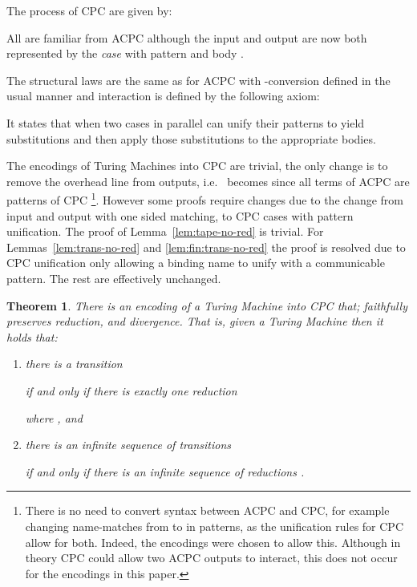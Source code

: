 \documentclass[submission,copyright,creativecommons]{eptcs}
\newtheorem{theorem}{Theorem}[section]
\begin{document}
The process of CPC are given by:

All are familiar from ACPC although the input and output are now both represented by
the {\em case}  with pattern  and body .

The structural laws are the same as for ACPC with -conversion defined in the usual
manner \cite{GivenWilsonGorlaJay10,givenwilson:hal-00987578} and interaction is defined by the following
axiom:

It states that when two cases in parallel can unify their patterns to yield substitutions
 and  then apply those substitutions to the appropriate bodies.


The encodings of Turing Machines into CPC are trivial, the only change is to remove
the overhead line from outputs, i.e.~ becomes  since all terms of
ACPC are patterns of CPC
\footnote{There is no need to convert syntax between ACPC and CPC, for example changing
name-matches from  to  in patterns, as the unification rules for CPC allow for both.
Indeed, the encodings were chosen to allow this.
Although in theory
CPC could allow two ACPC outputs to interact, this does not occur for the encodings in this paper.}.
However some proofs require changes due to the change from input and
output with one sided matching, to CPC cases with pattern unification.
The proof of Lemma~\ref{lem:tape-no-red} is trivial. For Lemmas~\ref{lem:trans-no-red}
and \ref{lem:fin:trans-no-red}
the proof is resolved due to CPC unification only allowing a binding name  to
unify with a communicable pattern.
The rest are effectively unchanged.

\begin{theorem}
\label{thm:cpc:done}
There is an encoding  of a Turing Machine into CPC that;
faithfully preserves reduction, and
divergence.
That is, given a Turing Machine 
then it holds that:
\begin{enumerate}
\item there is a transition

if and only if there is exactly one reduction

where , and
\item there is an infinite sequence of transitions

if and only if there is an infinite sequence of reductions
.
\end{enumerate}
\end{theorem}

\medskip


\newcommand{\cheq}{\stackrel\cdot\leftrightarrow}
\newcommand{\terms}{{\bf T}}
\newcommand{\assertion}{{\bf A}}
\newcommand{\one}{{\bf 1}}
\newcommand{\compose}{\otimes}
\newcommand{\assert}[1]{\llparenthesis \, #1 \, \rrparenthesis}
\newcommand{\fram}[1]{{\cal F}(#1)}
\end{document}
